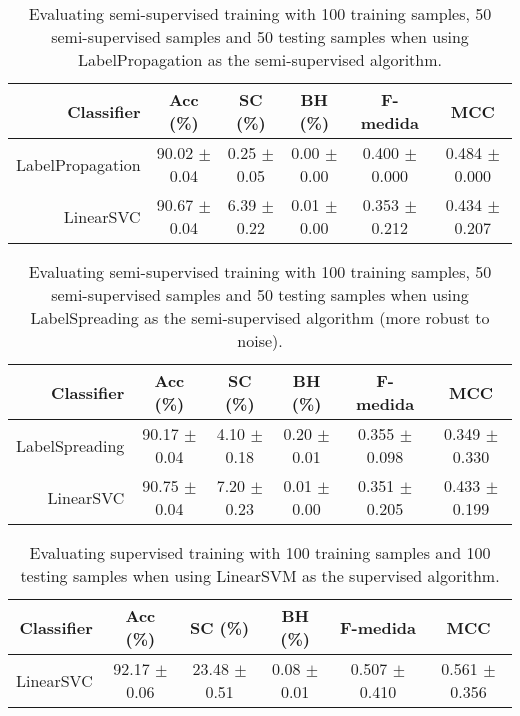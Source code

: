 \begin{table}[!htb]
\footnotesize
\centering
\caption{Evaluating semi-supervised training with 100 training samples, 50 semi-supervised samples and 50 testing samples when using LabelPropagation as the semi-supervised algorithm.}
\label{tab:label-propagation-PlayStation4_x7QhUL8NUK4}
\begin{tabular}{r|c|c|c|c|c}
\hline\hline
Classifier & Acc (\%) & SC (\%) & BH (\%) & F-medida & MCC \\ \hline
LabelPropagation & 90.02 $\pm$ 0.04 & 0.25 $\pm$ 0.05 & 0.00 $\pm$ 0.00 & 0.400 $\pm$ 0.000 & 0.484 $\pm$ 0.000 \\
LinearSVC & 90.67 $\pm$ 0.04 & 6.39 $\pm$ 0.22 & 0.01 $\pm$ 0.00 & 0.353 $\pm$ 0.212 & 0.434 $\pm$ 0.207 \\
\hline\hline
\end{tabular}
\end{table}
\begin{table}[!htb]
\footnotesize
\centering
\caption{Evaluating semi-supervised training with 100 training samples, 50 semi-supervised samples and 50 testing samples when using LabelSpreading as the semi-supervised algorithm (more robust to noise).}
\label{tab:label-spreading-PlayStation4_x7QhUL8NUK4}
\begin{tabular}{r|c|c|c|c|c}
\hline\hline
Classifier & Acc (\%) & SC (\%) & BH (\%) & F-medida & MCC \\ \hline
LabelSpreading & 90.17 $\pm$ 0.04 & 4.10 $\pm$ 0.18 & 0.20 $\pm$ 0.01 & 0.355 $\pm$ 0.098 & 0.349 $\pm$ 0.330 \\
LinearSVC & 90.75 $\pm$ 0.04 & 7.20 $\pm$ 0.23 & 0.01 $\pm$ 0.00 & 0.351 $\pm$ 0.205 & 0.433 $\pm$ 0.199 \\
\hline\hline
\end{tabular}
\end{table}
\begin{table}[!htb]
\footnotesize
\centering
\caption{Evaluating supervised training with 100 training samples and 100 testing samples when using LinearSVM as the supervised algorithm.}
\label{tab:linear-svm-PlayStation4_x7QhUL8NUK4}
\begin{tabular}{r|c|c|c|c|c}
\hline\hline
Classifier & Acc (\%) & SC (\%) & BH (\%) & F-medida & MCC \\ \hline
LinearSVC & 92.17 $\pm$ 0.06 & 23.48 $\pm$ 0.51 & 0.08 $\pm$ 0.01 & 0.507 $\pm$ 0.410 & 0.561 $\pm$ 0.356 \\
\hline\hline
\end{tabular}
\end{table}
